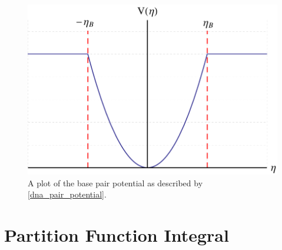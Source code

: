\begin{figure}[H]
\centering
\includegraphics[scale=0.6]{Graphics/DNA_Model/basepair_potential.pdf}
\caption{A plot of the base pair potential as described by \eqref{dna_pair_potential}.} 
\label{fig:dna_bp_pe}
\end{figure}
%


\section{Partition Function Integral}

